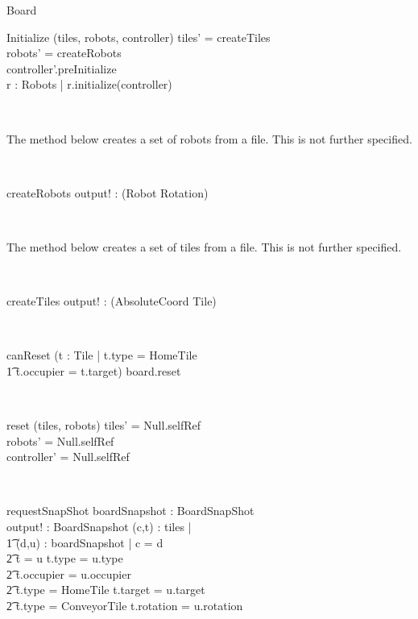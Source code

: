 \documentclass[12pt]{article}
\begin{document}
\begin{class}{Board}
\begin{schema}{Initialize}
\Delta (tiles, robots, controller)
\where
tiles' = createTiles \\
robots' = createRobots \\
controller'.preInitialize \\
\forall r : \dom Robots | r.initialize(controller)
\end{schema} \\
\begin{classcom}
The method below creates a set of robots from a file. This is not further specified.
\end{classcom} \\
\begin{schema}{createRobots}
output! : \power (Robot \fun Rotation)
\end{schema} \\
\begin{classcom}
The method below creates a set of tiles from a file. This is not further specified.
\end{classcom} \\
\begin{schema}{createTiles}
output! : \power (AbsoluteCoord \fun Tile)
\end{schema} \\
\begin{schema}{canReset}
\where
(\exists t : Tile | t.type = HomeTile \\ \t1
t.occupier = t.target) \Rightarrow board.reset
\end{schema} \\
\begin{schema}{reset}
\Delta (tiles, robots)
\where
tiles' = Null.selfRef \\
robots' = Null.selfRef \\
controller' = Null.selfRef
\end{schema} \\
\znewpage
\begin{schema}{requestSnapShot}
boardSnapshot : BoardSnapShot \\
output! : BoardSnapshot
\where
\forall (c,t) : tiles |  \\ \t1
\exists (d,u) : boardSnapshot | c = d \: \wedge \\ \t2 t \not = u \wedge t.type = u.type \: \wedge \\ \t2 t.occupier = u.occupier \: \wedge \\ \t2 t.type = HomeTile \Rightarrow t.target = u.target \: \wedge \\ \t2 t.type = ConveyorTile \Rightarrow t.rotation = u.rotation \\

\end{schema}
\end{class}
\end{document}
